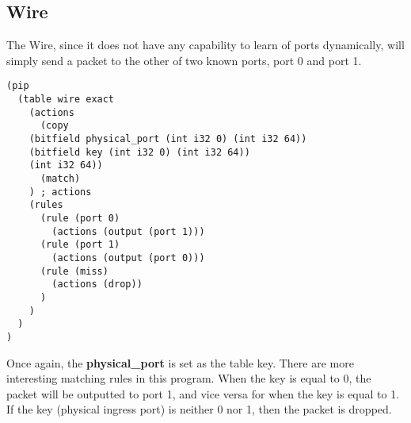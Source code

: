 \documentclass{article}
\begin{document}
\subsection{Wire}
The Wire, since it does not have any capability to learn of ports dynamically, will simply send a packet to the other of two known ports, port 0 and port 1.
\begin{verbatim}
(pip
  (table wire exact
    (actions
      (copy
	(bitfield physical_port (int i32 0) (int i32 64))
	(bitfield key (int i32 0) (int i32 64))
	(int i32 64))
      (match)
    ) ; actions
    (rules
      (rule (port 0)
        (actions (output (port 1)))
      (rule (port 1)
        (actions (output (port 0)))
      (rule (miss)
        (actions (drop))
      )
    )
  )
)
\end{verbatim}
Once again, the \textbf{physical\_port} is set as the table key. There are more interesting matching rules in this program. When the key is equal to 0, the packet will be outputted to port 1, and vice versa for when the key is equal to 1. If the key (physical ingress port) is neither 0 nor 1, then the packet is dropped.
\end{document}
